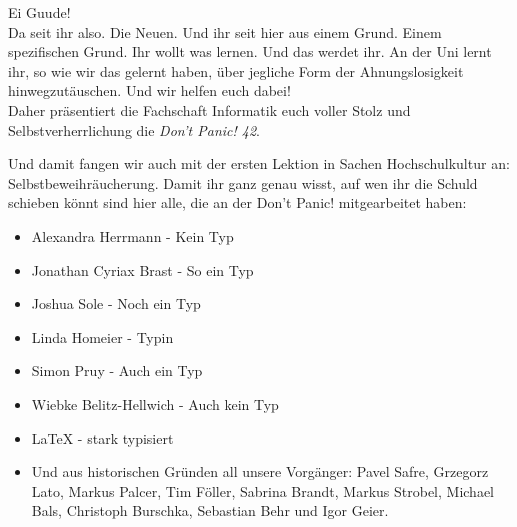Ei Guude!\\

Da seit ihr also. Die Neuen. Und ihr seit hier aus einem Grund. Einem spezifischen Grund. Ihr wollt was lernen.
Und das werdet ihr. An der Uni lernt ihr, so wie wir das gelernt haben,
\"uber jegliche Form der Ahnungslosigkeit hinwegzut\"auschen. Und wir helfen euch dabei!\\

Daher pr\"asentiert die Fachschaft Informatik euch voller Stolz und Selbstverherrlichung die \emph{Don't Panic! 42}.

Und damit fangen wir auch mit der ersten Lektion in Sachen Hochschulkultur an: Selbstbeweihr\"aucherung.
Damit ihr ganz genau wisst, auf wen ihr die Schuld schieben k\"onnt sind hier alle, die an der Don't Panic! mitgearbeitet haben:
\begin{itemize}
\item Alexandra Herrmann - Kein Typ
\item Jonathan Cyriax Brast - So ein Typ
\item Joshua Sole - Noch ein Typ
\item Linda Homeier - Typin
\item Simon Pruy - Auch ein Typ
\item Wiebke Belitz-Hellwich - Auch kein Typ
\item LaTeX - stark typisiert
\item Und aus historischen Gr\"unden all unsere Vorg\"anger:
Pavel Safre, Grzegorz Lato, Markus Palcer, Tim F\"oller, Sabrina Brandt, Markus Strobel, Michael Bals, Christoph Burschka, Sebastian Behr und Igor Geier.
\end{itemize}


